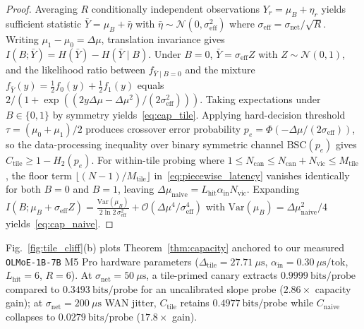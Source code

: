 \documentclass[10pt,journal,compsoc]{IEEEtran}
\theoremstyle{definition}
\theoremstyle{remark}
\begin{document}
\begin{proof}
Averaging $R$ conditionally independent observations $Y_r = \mu_B + \eta_r$ yields sufficient statistic $\bar{Y} = \mu_B + \bar{\eta}$ with $\bar{\eta} \sim \mathcal{N}(0, \sigma_{\mathrm{eff}}^2)$ where $\sigma_{\mathrm{eff}} = \sigma_{\mathrm{net}}/\sqrt{R}$. Writing $\mu_1 - \mu_0 = \Delta\mu$, translation invariance gives $I(B; \bar{Y}) = H(\bar{Y}) - H(\bar{Y} \mid B)$. Under $B=0$, $\bar{Y} = \sigma_{\mathrm{eff}} Z$ with $Z \sim \mathcal{N}(0,1)$, and the likelihood ratio between $f_{\bar{Y}\mid B=0}$ and the mixture $f_{\bar{Y}}(y) = \frac{1}{2} f_0(y) + \frac{1}{2} f_1(y)$ equals $2 / (1 + \exp((2 y \Delta\mu - \Delta\mu^2)/(2\sigma_{\mathrm{eff}}^2)))$. Taking expectations under $B \in \{0,1\}$ by symmetry yields~\eqref{eq:cap_tile}. Applying hard-decision threshold $\tau = (\mu_0 + \mu_1)/2$ produces crossover error probability $p_e = \Phi(-\Delta\mu / (2\sigma_{\mathrm{eff}}))$, so the data-processing inequality over binary symmetric channel $\mathrm{BSC}(p_e)$ gives $C_{\mathrm{tile}} \ge 1 - H_2(p_e)$. For within-tile probing where $1 \le N_{\mathrm{can}} \le N_{\mathrm{can}} + N_{\mathrm{vic}} \le M_{\mathrm{tile}}$, the floor term $\lfloor (N-1)/M_{\mathrm{tile}} \rfloor$ in~\eqref{eq:piecewise_latency} vanishes identically for both $B=0$ and $B=1$, leaving $\Delta\mu_{\mathrm{naive}} = L_{\mathrm{hit}} \alpha_{\mathrm{in}} N_{\mathrm{vic}}$. Expanding $I(B; \mu_B + \sigma_{\mathrm{eff}} Z) = \frac{\mathrm{Var}(\mu_B)}{2 \ln 2 \, \sigma_{\mathrm{eff}}^2} + \mathcal{O}(\Delta\mu^4 / \sigma_{\mathrm{eff}}^4)$ with $\mathrm{Var}(\mu_B) = \Delta\mu_{\mathrm{naive}}^2 / 4$ yields~\eqref{eq:cap_naive}.
\end{proof}

Fig.~\ref{fig:tile_cliff}(b) plots Theorem~\ref{thm:capacity} anchored to our measured \texttt{OLMoE-1B-7B} M5 Pro hardware parameters ($\Delta_{\mathrm{tile}} = 27.71~\mu\mathrm{s}$, $\alpha_{\mathrm{in}} = 0.30~\mu\mathrm{s}/\text{tok}$, $L_{\mathrm{hit}} = 6$, $R = 6$). At $\sigma_{\mathrm{net}} = 50~\mu\mathrm{s}$, a tile-primed canary extracts $0.9999~\mathrm{bits/probe}$ compared to $0.3493~\mathrm{bits/probe}$ for an uncalibrated slope probe ($2.86\times$ capacity gain); at $\sigma_{\mathrm{net}} = 200~\mu\mathrm{s}$ WAN jitter, $C_{\mathrm{tile}}$ retains $0.4977~\mathrm{bits/probe}$ while $C_{\mathrm{naive}}$ collapses to $0.0279~\mathrm{bits/probe}$ ($17.8\times$ gain).
\end{document}
